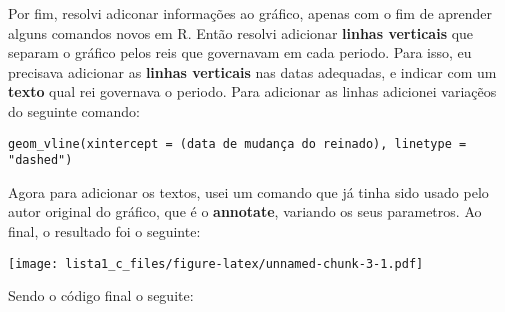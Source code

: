 \documentclass[
]{article}
\begin{document}
Por fim, resolvi adiconar informações ao gráfico, apenas com o fim de
aprender alguns comandos novos em R. Então resolvi adicionar
\textbf{linhas verticais} que separam o gráfico pelos reis que
governavam em cada periodo. Para isso, eu precisava adicionar as
\textbf{linhas verticais} nas datas adequadas, e indicar com um
\textbf{texto} qual rei governava o periodo. Para adicionar as linhas
adicionei variaçẽos do seguinte comando:

\begin{verbatim}
geom_vline(xintercept = (data de mudança do reinado), linetype = "dashed")
\end{verbatim}

Agora para adicionar os textos, usei um comando que já tinha sido usado
pelo autor original do gráfico, que é o \textbf{annotate}, variando os
seus parametros. Ao final, o resultado foi o seguinte:

\texttt{[image: lista1\_c\_files/figure-latex/unnamed-chunk-3-1.pdf]}

Sendo o código final o seguite:
\end{document}
